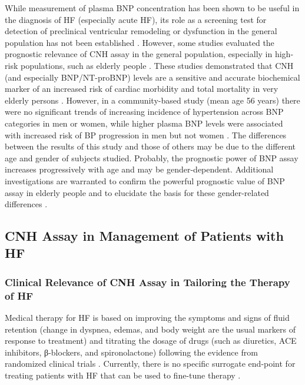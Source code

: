\documentclass[14pt,a4paper,onecolumn]{extarticle}
\begin{document}
While measurement of plasma BNP concentration has been shown to be useful in the
diagnosis of HF (especially acute HF), its role as a screening test for detection of preclinical ventricular remodeling or dysfunction in the general population has not been
established \citep{bib35} \citep{bib3246} \citep{bib3247}. However, some studies evaluated the prognostic relevance of
CNH assay in the general population, especially in high-risk populations, such as elderly people \citep{bib316} \citep{bib3187} \citep{bib3224} \citep{bib3244} \citep{bib3245} \citep{bib3246} \citep{bib3247} \citep{bib3248}. These studies demonstrated that CNH (and especially BNP/NT-proBNP) levels are a sensitive and accurate biochemical marker of an
increased risk of cardiac morbidity and total mortality in very elderly persons \citep{bib316} \citep{bib3147} \citep{bib3188} \citep{bib3227} \citep{bib3248} \citep{bib3249}. However, in a community-based study (mean age 56 years) there
were no significant trends of increasing incidence of hypertension across BNP categories in men or women, while higher plasma BNP levels were associated with increased
risk of BP progression in men but not women \citep{bib3250}. The differences between the results
of this study \citep{bib3250} and those of others \citep{bib316} \citep{bib3185} \citep{bib3227} \citep{bib3248} \citep{bib3249} may be due to the different age and gender of subjects studied. Probably, the prognostic power of BNP assay
increases progressively with age and may be gender-dependent.
Additional investigations are warranted to confirm the powerful prognostic value of
BNP assay in elderly people and to elucidate the basis for these gender-related differences \citep{bib3246} \citep{bib3247}.


\subsection{ CNH Assay in Management of Patients with HF}


\subsubsection{ Clinical Relevance of CNH Assay in Tailoring the Therapy of HF}

Medical therapy for HF is based on improving the symptoms and signs of fluid retention (change in dyspnea, edemas, and body weight are the usual markers of response to
treatment) and titrating the dosage of drugs (such as diuretics, ACE inhibitors, β-blockers, and spironolactone) following the evidence from randomized clinical trials \citep{bib365} \citep{bib368} \citep{bib369} \citep{bib370}. Currently, there is no specific surrogate end-point for treating patients with HF
that can be used to fine-tune therapy \citep{bib365} \citep{bib368} \citep{bib369} \citep{bib370}.
\end{document}
